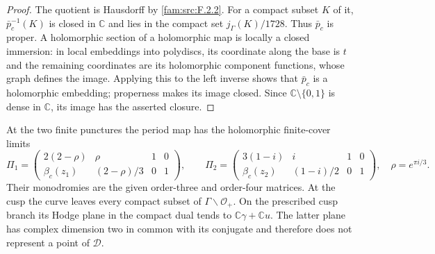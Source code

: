 \begin{proof}
The quotient is Hausdorff by \ref{fam:src:F.2.2}.  For a compact subset $K$ of it,
$\bar p_c^{-1}(K)$ is closed in $\mathbb C$ and lies in the compact set
$j_\Gamma(K)/1728$.  Thus $\bar p_c$ is proper.  A holomorphic section of
a holomorphic map is locally a closed immersion: in local embeddings
into polydiscs, its coordinate along the base is $t$ and the remaining
coordinates are its holomorphic component functions, whose graph
defines the image.  Applying this to the left inverse shows that
$\bar p_c$ is a holomorphic embedding; properness makes its image
closed.  Since $\mathbb C\setminus\{0,1\}$ is dense in $\mathbb C$, its
image has the asserted closure.
\end{proof}

\begin{proposition}\label{fam:src:F.3.2}\label{fam:st:F.3.2}
At the two finite punctures the period map has the holomorphic
finite-cover limits
\[
 \Pi_1=
 \begin{pmatrix}2(2-\rho)&\rho&1&0\\
 \beta_c(z_1)&(2-\rho)/3&0&1\end{pmatrix},\qquad
 \Pi_2=
 \begin{pmatrix}3(1-i)&i&1&0\\
 \beta_c(z_2)&(1-i)/2&0&1\end{pmatrix},
 \quad \rho=e^{\pi i/3}.
\]
Their monodromies are the given order-three and order-four matrices.
At the cusp the curve leaves every compact subset of
$\Gamma\backslash\mathcal O_+$.  On the prescribed cusp branch its
Hodge plane in the compact dual tends to
$\mathbb C\gamma+\mathbb Cu$.  The latter plane has complex dimension
two in common with its conjugate and therefore does not represent a
point of $\mathcal D$.
\end{proposition}


